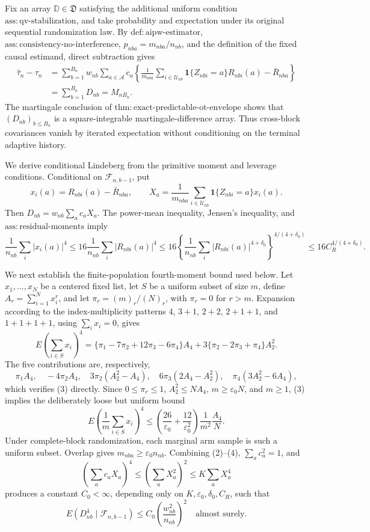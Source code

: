 Fix an array \(\mathbb D\in\mathfrak D\) satisfying the additional uniform condition \(\mathrm{ass:qv\text{-}stabilization}\), and take probability and expectation under its original sequential randomization law. By \(\mathrm{def:aipw\text{-}estimator}\), \(\mathrm{ass:consistency\text{-}no\text{-}interference}\), \(p_{nba}=m_{nba}/n_{nb}\), and the definition of the fixed causal estimand, direct subtraction gives
\[
\begin{aligned}
\widehat\tau_n-\tau_n
&=\sum_{b=1}^{B_n}w_{nb}\sum_{a\in\mathcal A}c_a
\left\{\frac1{m_{nba}}\sum_{i\in\mathcal U_{nb}}
\mathbf1\{Z_{nbi}=a\}R_{nbi}(a)-\bar R_{nba}\right\}\\
&=\sum_{b=1}^{B_n}D_{nb}=M_{nB_n}.
\end{aligned}
\tag{1}
\]
The martingale conclusion of \(\mathrm{thm:exact\text{-}predictable\text{-}ot\text{-}envelope}\) shows that \((D_{nb})_{b\le B_n}\) is a square-integrable martingale-difference array. Thus cross-block covariances vanish by iterated expectation without conditioning on the terminal adaptive history.

We derive conditional Lindeberg from the primitive moment and leverage conditions. Conditional on \(\mathcal F_{n,b-1}\), put
\[
x_i(a)=R_{nbi}(a)-\bar R_{nba},
\qquad
X_a=\frac1{m_{nba}}\sum_{i\in\mathcal U_{nb}}
\mathbf1\{Z_{nbi}=a\}x_i(a).
\]
Then \(D_{nb}=w_{nb}\sum_ac_aX_a\). The power-mean inequality, Jensen's inequality, and \(\mathrm{ass:residual\text{-}moments}\) imply
\[
\frac1{n_{nb}}\sum_i|x_i(a)|^4
\le16\frac1{n_{nb}}\sum_i|R_{nbi}(a)|^4
\le16\left\{\frac1{n_{nb}}\sum_i|R_{nbi}(a)|^{4+\delta_0}\right\}^{4/(4+\delta_0)}
\le16C_R^{4/(4+\delta_0)}.
\tag{2}
\]

We next establish the finite-population fourth-moment bound used below. Let \(x_1,\ldots,x_N\) be a centered fixed list, let \(S\) be a uniform subset of size \(m\), define \(A_r=\sum_{i=1}^Nx_i^r\), and let \(\pi_r=(m)_r/(N)_r\), with \(\pi_r=0\) for \(r>m\). Expansion according to the index-multiplicity patterns \(4\), \(3+1\), \(2+2\), \(2+1+1\), and \(1+1+1+1\), using \(\sum_ix_i=0\), gives
\[
E\left(\sum_{i\in S}x_i\right)^4
=\{\pi_1-7\pi_2+12\pi_3-6\pi_4\}A_4
+3\{\pi_2-2\pi_3+\pi_4\}A_2^2.
\tag{3}
\]
The five contributions are, respectively,
\[
\pi_1A_4,\quad -4\pi_2A_4,\quad
3\pi_2(A_2^2-A_4),\quad
6\pi_3(2A_4-A_2^2),\quad
\pi_4(3A_2^2-6A_4),
\]
which verifies (3) directly. Since \(0\le\pi_r\le1\), \(A_2^2\le NA_4\), \(m\ge\varepsilon_0N\), and \(m\ge1\), (3) implies the deliberately loose but uniform bound
\[
E\left(\frac1m\sum_{i\in S}x_i\right)^4
\le\left(\frac{26}{\varepsilon_0}+\frac{12}{\varepsilon_0^2}\right)
\frac1{m^2}\frac{A_4}{N}.
\tag{4}
\]
Under complete-block randomization, each marginal arm sample is such a uniform subset. Overlap gives \(m_{nba}\ge\varepsilon_0n_{nb}\). Combining (2)--(4), \(\sum_ac_a^2=1\), and
\[
\left(\sum_ac_aX_a\right)^4
\le\left(\sum_aX_a^2\right)^2
\le K\sum_aX_a^4
\]
produces a constant \(C_0<\infty\), depending only on \(K,\varepsilon_0,\delta_0,C_R\), such that
\[
E(D_{nb}^4\mid\mathcal F_{n,b-1})
\le C_0\left(\frac{w_{nb}^2}{n_{nb}}\right)^2
\quad\text{almost surely}.
\tag{5}
\]

